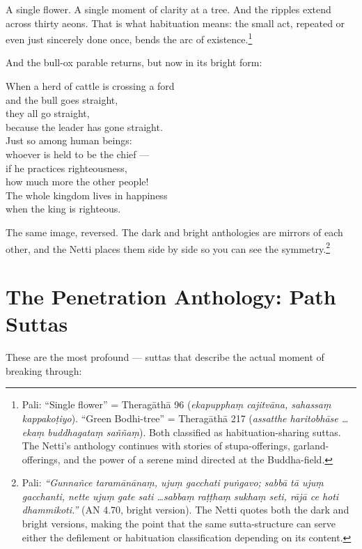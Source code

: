 \noindent A single flower. A single moment of clarity at a tree. And the ripples extend across thirty aeons. That is what habituation means: the small act, repeated or even just sincerely done once, bends the arc of existence.\footnote{Pali: ``Single flower'' = Theragāthā 96 (\textit{ekapupphaṃ cajitvāna, sahassaṃ kappakoṭiyo}). ``Green Bodhi-tree'' = Theragāthā 217 (\textit{assatthe haritobhāse \ldots ekaṃ buddhagataṃ saññaṃ}). Both classified as habituation-sharing suttas. The Netti's anthology continues with stories of stupa-offerings, garland-offerings, and the power of a serene mind directed at the Buddha-field.}

And the bull-ox parable returns, but now in its bright form:

\begin{versebox}
When a herd of cattle is crossing a ford\\
and the bull goes straight,\\
they all go straight,\\
because the leader has gone straight.\\[6pt]
Just so among human beings:\\
whoever is held to be the chief ---\\
if he practices righteousness,\\
how much more the other people!\\
The whole kingdom lives in happiness\\
when the king is righteous.
\end{versebox}

\noindent The same image, reversed. The dark and bright anthologies are mirrors of each other, and the Netti places them side by side so you can see the symmetry.\footnote{Pali: \textit{``Gunnañce taramānānaṃ, ujuṃ gacchati puṅgavo; sabbā tā ujuṃ gacchanti, nette ujuṃ gate sati \ldots sabbaṃ raṭṭhaṃ sukhaṃ seti, rājā ce hoti dhammikoti.''} (AN 4.70, bright version). The Netti quotes both the dark and bright versions, making the point that the same sutta-structure can serve either the defilement or habituation classification depending on its content.}

\section*{The Penetration Anthology: Path Suttas}

These are the most profound --- suttas that describe the actual moment of breaking through:

